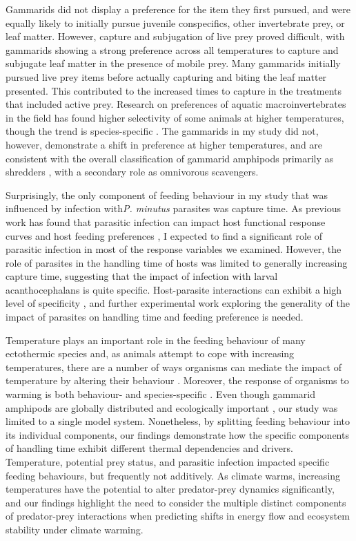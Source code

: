 Gammarids did not display a preference for the item they first pursued, and were equally likely to initially pursue juvenile conspecifics, other invertebrate prey, or leaf matter. However, capture and subjugation of live prey proved difficult, with gammarids showing a strong preference across all temperatures to capture and subjugate leaf matter in the presence of mobile prey. Many gammarids initially pursued live prey items before actually capturing and biting the leaf matter presented. This contributed to the increased times to capture in the treatments that included active prey. Research on preferences of aquatic macroinvertebrates in the field has found higher selectivity of some animals at higher temperatures, though the trend is species-specific \citep{boersma2016, ogorman2016}. The gammarids in my study did not, however, demonstrate a shift in preference at higher temperatures, and are consistent with the overall classification of gammarid amphipods primarily as shredders \citep{cummins1979, macneil1997}, with a secondary role as omnivorous scavengers.   

Surprisingly, the only component of feeding behaviour in my study that was influenced by infection with\emph{P. minutus} parasites was capture time. As previous work has found that parasitic infection can impact host functional response curves \citep{toscano2014} and host feeding preferences \citep{bunke2015}, I expected to find a significant role of parasitic infection in most of the response variables we examined. However, the role of parasites in the handling time of hosts was limited to generally increasing capture time, suggesting that the impact of infection with larval acanthocephalans is quite specific. Host-parasite interactions can exhibit a high level of specificity \citep{hynes1958, zittel2018}, and further experimental work exploring the generality of the impact of parasites on handling time and feeding preference is needed. 

Temperature plays an important role in the feeding behaviour of many ectothermic species and, as animals attempt to cope with increasing temperatures, there are a number of ways organisms can mediate the impact of temperature by altering their behaviour \citep{barnes2015, vandervorste2017}. Moreover, the response of organisms to warming is both behaviour- and species-specific \citep{dell2011, enlund2011, ohlund2015}. Even though gammarid amphipods are globally distributed \citep{karaman1977} and ecologically important \citep{little2018}, our study was limited to a single model system. Nonetheless, by splitting feeding behaviour into its individual components, our findings demonstrate how the specific components of handling time exhibit different thermal dependencies and drivers. Temperature, potential prey status, and parasitic infection impacted specific feeding behaviours, but frequently not additively. As climate warms, increasing temperatures have the potential to alter predator-prey dynamics significantly, and our findings highlight the need to consider the multiple distinct components of predator-prey interactions when predicting shifts in energy flow and ecosystem stability under climate warming. 